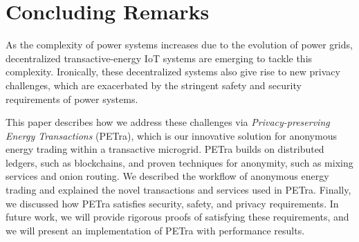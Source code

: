 \section{Concluding Remarks}
\label{sec:concl}

As the complexity of power systems increases due to the evolution of
power grids, decentralized transactive-energy IoT systems are emerging
to tackle this complexity. Ironically, these decentralized systems
also give rise to new privacy challenges,
which are exacerbated by the stringent safety and
security requirements of power systems.

This paper describes how we address these challenges via
\emph{Privacy-preserving Energy Transactions} (PETra), which is our
innovative solution for anonymous energy trading within a transactive
microgrid.  PETra builds on distributed ledgers, such as blockchains,
and proven techniques for anonymity, such as mixing services and onion
routing.  We described the workflow of anonymous energy trading and
explained the novel transactions and services used in PETra.  Finally,
we discussed how PETra satisfies security, safety, and privacy
requirements.  In future work, we will provide rigorous proofs of
satisfying these requirements, and we will present an implementation
of PETra with performance results.
